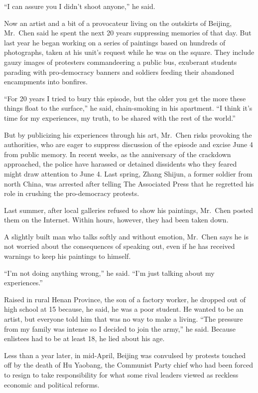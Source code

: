 \documentclass[12pt,a4paper,onecolumn]{article}
\begin{document}
``I can assure you I didn't shoot anyone,'' he said.

Now an artist and a bit of a provocateur living on the outskirts of Beijing, Mr.~Chen said he spent
the next 20 years suppressing memories of that day. But last year he began working on a series of
paintings based on hundreds of photographs, taken at his unit's request while he was on the square.
They include gauzy images of protesters commandeering a public bus, exuberant students parading with
pro-democracy banners and soldiers feeding their abandoned encampments into bonfires.

``For 20 years I tried to bury this episode, but the older you get the more these things float to
the surface,'' he said, chain-smoking in his apartment. ``I think it's time for my experiences, my
truth, to be shared with the rest of the world.''

But by publicizing his experiences through his art, Mr.~Chen risks provoking the authorities, who
are eager to suppress discussion of the episode and excise June 4 from public memory. In recent
weeks, as the anniversary of the crackdown approached, the police have harassed or detained
dissidents who they feared might draw attention to June 4. Last spring, Zhang Shijun, a former
soldier from north China, was arrested after telling The Associated Press that he regretted his role
in crushing the pro-democracy protests.

Last summer, after local galleries refused to show his paintings, Mr.~Chen posted them on the
Internet. Within hours, however, they had been taken down.

A slightly built man who talks softly and without emotion, Mr.~Chen says he is not worried about the
consequences of speaking out, even if he has received warnings to keep his paintings to himself.

``I'm not doing anything wrong,'' he said. ``I'm just talking about my experiences.''

Raised in rural Henan Province, the son of a factory worker, he dropped out of high school at 15
because, he said, he was a poor student. He wanted to be an artist, but everyone told him that was
no way to make a living. ``The pressure from my family was intense so I decided to join the army,''
he said. Because enlistees had to be at least 18, he lied about his age.

Less than a year later, in mid-April, Beijing was convulsed by protests touched off by the death of
Hu Yaobang, the Communist Party chief who had been forced to resign to take responsibility for what
some rival leaders viewed as reckless economic and political reforms.
\end{document}
